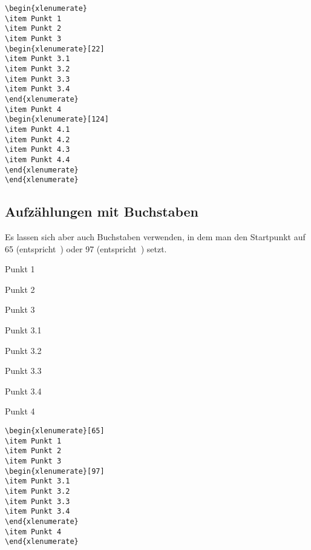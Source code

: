 \documentclass{fontdokuold}
\begin{document}
\begin{lstlisting}
\begin{xlenumerate}
\item Punkt 1
\item Punkt 2
\item Punkt 3
\begin{xlenumerate}[22]
\item Punkt 3.1
\item Punkt 3.2
\item Punkt 3.3
\item Punkt 3.4
\end{xlenumerate}
\item Punkt 4
\begin{xlenumerate}[124]
\item Punkt 4.1
\item Punkt 4.2
\item Punkt 4.3
\item Punkt 4.4
\end{xlenumerate}
\end{xlenumerate}
\end{lstlisting}

\subsection{Aufzählungen mit Buchstaben}

Es lassen sich aber auch Buchstaben verwenden, in dem man den Startpunkt
auf 65 (entspricht~) oder 97 (entspricht~) setzt.



\begin{xlenumerate}[65]
\item Punkt 1
\item Punkt 2
\item Punkt 3
\begin{xlenumerate}[97]
\item Punkt 3.1
\item Punkt 3.2
\item Punkt 3.3
\item Punkt 3.4
\end{xlenumerate}
\item Punkt 4
\end{xlenumerate}

\begin{lstlisting}
\begin{xlenumerate}[65]
\item Punkt 1
\item Punkt 2
\item Punkt 3
\begin{xlenumerate}[97]
\item Punkt 3.1
\item Punkt 3.2
\item Punkt 3.3
\item Punkt 3.4
\end{xlenumerate}
\item Punkt 4
\end{xlenumerate}
\end{lstlisting}
\end{document}

